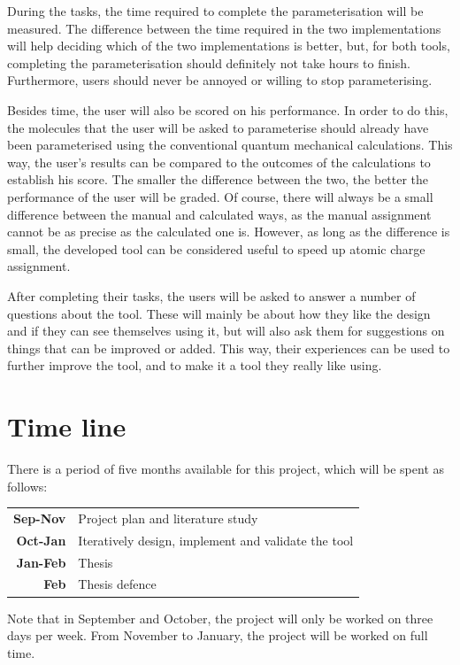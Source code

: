 During the tasks, the time required to complete the parameterisation will be measured. The difference between the time required in the two implementations will help deciding which of the two implementations is better, but, for both tools, completing the parameterisation should definitely not take hours to finish. Furthermore, users should never be annoyed or willing to stop parameterising.

Besides time, the user will also be scored on his performance. In order to do this, the molecules that the user will be asked to parameterise should already have been parameterised using the conventional quantum mechanical calculations. This way, the user's results can be compared to the outcomes of the calculations to establish his score. The smaller the difference between the two, the better the performance of the user will be graded. Of course, there will always be a small difference between the manual and calculated ways, as the manual assignment cannot be as precise as the calculated one is. However, as long as the difference is small, the developed tool can be considered useful to speed up atomic charge assignment.

After completing their tasks, the users will be asked to answer a number of questions about the tool. These will mainly be about how they like the design and if they can see themselves using it, but will also ask them for suggestions on things that can be improved or added. This way, their experiences can be used to further improve the tool, and to make it a tool they really like using.


\section{Time line}

There is a period of five months available for this project, which will be spent as follows:

\noindent
\begin{tabular}{r|l}
\textbf{Sep-Nov} & Project plan and literature study\\
\textbf{Oct-Jan} & Iteratively design, implement and validate the tool\\
\textbf{Jan-Feb} & Thesis\\
\textbf{Feb} & Thesis defence
\end{tabular}

\noindent
Note that in September and October, the project will only be worked on three days per week. From November to January, the project will be worked on full time.

